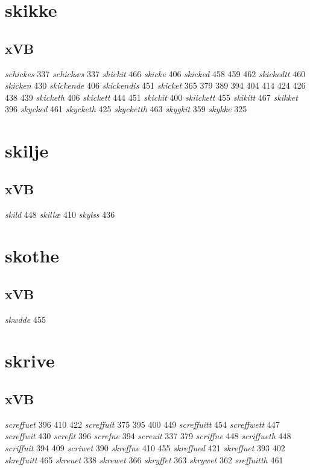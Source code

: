 \documentclass[a4paper,twocolumn]{article}
\begin{document}
\section{skikke}
\label{sec:orgb4a24c0}
\subsection{xVB}
\label{sec:orgdf69f12}
\emph{schickes} 337 \emph{schickæs} 337 \emph{shickit} 466 \emph{skicke} 406 \emph{skicked} 458 459 462 \emph{skickedtt} 460 \emph{skicken} 430 \emph{skickende} 406 \emph{skickendis} 451 \emph{skicket} 365 379 389 394 404 414 424 426 438 439 \emph{skicketh} 406 \emph{skickett} 444 451 \emph{skickit} 400 \emph{skiickett} 455 \emph{skikitt} 467 \emph{skikket} 396 \emph{skycked} 461 \emph{skycketh} 425 \emph{skycketth} 463 \emph{skygkit} 359 \emph{skykke} 325 
\section{skilje}
\label{sec:orgaea8e8f}
\subsection{xVB}
\label{sec:orgaa2bd9c}
\emph{skild} 448 \emph{skillæ} 410 \emph{skylss} 436 
\section{skothe}
\label{sec:org13ceb62}
\subsection{xVB}
\label{sec:org3f936f1}
\emph{skwdde} 455 
\section{skrive}
\label{sec:org33fd786}
\subsection{xVB}
\label{sec:org2d38920}
\emph{screffuet} 396 410 422 \emph{screffuit} 375 395 400 449 \emph{screffuitt} 454 \emph{screffwett} 447 \emph{screffwit} 430 \emph{screfit} 396 \emph{screfne} 394 \emph{screuit} 337 379 \emph{scriffne} 448 \emph{scriffueth} 448 \emph{scriffuit} 394 409 \emph{scriwet} 390 \emph{skreffne} 410 455 \emph{skreffued} 421 \emph{skreffuet} 393 402 \emph{skreffuitt} 465 \emph{skreuet} 338 \emph{skrewet} 366 \emph{skryffet} 363 \emph{skrywet} 362 \emph{sreffuitth} 461 
\end{document}
